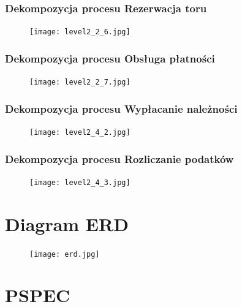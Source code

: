 \documentclass[a4paper,11pt]{article}
\begin{document}
\subsubsection{Dekompozycja procesu Rezerwacja toru}
    \begin{figure}[!htb]
    \centerline{\texttt{[image: level2\_2\_6.jpg]}}
    \label{fig:level2_2_6}
    \end{figure}
    \newpage
    
\subsubsection{Dekompozycja procesu Obsługa płatności}
    \begin{figure}[!htb]
    \centerline{\texttt{[image: level2\_2\_7.jpg]}}
    \label{fig:level2_2_7}
    \end{figure}
    \newpage
    
\subsubsection{Dekompozycja procesu Wypłacanie należności}
    \begin{figure}[!htb]
    \centerline{\texttt{[image: level2\_4\_2.jpg]}}
    \label{fig:level2_4_2}
    \end{figure}
    \newpage
 
\subsubsection{Dekompozycja procesu Rozliczanie podatków}
    \begin{figure}[!htb]
    \centerline{\texttt{[image: level2\_4\_3.jpg]}}
    \label{fig:level2_4_3}
    \end{figure}
    \newpage

\section{Diagram ERD}   
 \begin{figure}[!htb]
    \centerline{\texttt{[image: erd.jpg]}}
    \label{fig:erd}
    \end{figure}
    \newpage

\section{PSPEC}
\end{document}
